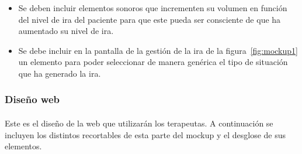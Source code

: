 \begin{itemize}
    \item Se deben incluir elementos sonoros que incrementen su volumen en función del nivel de ira del paciente para que este pueda ser consciente de que ha aumentado su nivel de ira.
    \item Se debe incluir en la pantalla de la gestión de la ira de la figura~\ref{fig:mockup1} un elemento para poder seleccionar de manera genérica el tipo de situación que ha generado la ira.
\end{itemize}

\subsubsection{Diseño web}
\paragraph{}
Este es el diseño de la web que utilizarán los terapeutas. A continuación se incluyen los distintos recortables de esta parte del mockup y el desglose de sus elementos.
